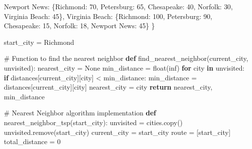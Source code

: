 \documentclass[
  letterpaper,
  DIV=11,
  numbers=noendperiod]{scrreprt}
\newenvironment{Shaded}{\begin{snugshade}}{\end{snugshade}}
\newcommand{\BuiltInTok}[1]{\textcolor[rgb]{0.00,0.23,0.31}{#1}}
\newcommand{\CommentTok}[1]{\textcolor[rgb]{0.37,0.37,0.37}{#1}}
\newcommand{\ControlFlowTok}[1]{\textcolor[rgb]{0.00,0.23,0.31}{\textbf{#1}}}
\newcommand{\DecValTok}[1]{\textcolor[rgb]{0.68,0.00,0.00}{#1}}
\newcommand{\KeywordTok}[1]{\textcolor[rgb]{0.00,0.23,0.31}{\textbf{#1}}}
\newcommand{\NormalTok}[1]{\textcolor[rgb]{0.00,0.23,0.31}{#1}}
\newcommand{\OperatorTok}[1]{\textcolor[rgb]{0.37,0.37,0.37}{#1}}
\newcommand{\StringTok}[1]{\textcolor[rgb]{0.13,0.47,0.30}{#1}}
\newcommand{\VariableTok}[1]{\textcolor[rgb]{0.07,0.07,0.07}{#1}}
\begin{document}
\begin{Shaded}
\begin{Highlighting}[]
    \StringTok{\textquotesingle{}Newport News\textquotesingle{}}\NormalTok{: \{}\StringTok{\textquotesingle{}Richmond\textquotesingle{}}\NormalTok{: }\DecValTok{70}\NormalTok{, }\StringTok{\textquotesingle{}Petersburg\textquotesingle{}}\NormalTok{: }\DecValTok{65}\NormalTok{, }\StringTok{\textquotesingle{}Chesapeake\textquotesingle{}}\NormalTok{: }\DecValTok{40}\NormalTok{, }\StringTok{\textquotesingle{}Norfolk\textquotesingle{}}\NormalTok{: }\DecValTok{30}\NormalTok{, }\StringTok{\textquotesingle{}Virginia Beach\textquotesingle{}}\NormalTok{: }\DecValTok{45}\NormalTok{\},}
    \StringTok{\textquotesingle{}Virginia Beach\textquotesingle{}}\NormalTok{: \{}\StringTok{\textquotesingle{}Richmond\textquotesingle{}}\NormalTok{: }\DecValTok{100}\NormalTok{, }\StringTok{\textquotesingle{}Petersburg\textquotesingle{}}\NormalTok{: }\DecValTok{90}\NormalTok{, }\StringTok{\textquotesingle{}Chesapeake\textquotesingle{}}\NormalTok{: }\DecValTok{15}\NormalTok{, }\StringTok{\textquotesingle{}Norfolk\textquotesingle{}}\NormalTok{: }\DecValTok{18}\NormalTok{, }\StringTok{\textquotesingle{}Newport News\textquotesingle{}}\NormalTok{: }\DecValTok{45}\NormalTok{\}}
\NormalTok{\}}

\NormalTok{start\_city }\OperatorTok{=} \StringTok{\textquotesingle{}Richmond\textquotesingle{}}

\CommentTok{\# Function to find the nearest neighbor}
\KeywordTok{def}\NormalTok{ find\_nearest\_neighbor(current\_city, unvisited):}
\NormalTok{    nearest\_city }\OperatorTok{=} \VariableTok{None}
\NormalTok{    min\_distance }\OperatorTok{=} \BuiltInTok{float}\NormalTok{(}\StringTok{\textquotesingle{}inf\textquotesingle{}}\NormalTok{)}
    \ControlFlowTok{for}\NormalTok{ city }\KeywordTok{in}\NormalTok{ unvisited:}
        \ControlFlowTok{if}\NormalTok{ distances[current\_city][city] }\OperatorTok{\textless{}}\NormalTok{ min\_distance:}
\NormalTok{            min\_distance }\OperatorTok{=}\NormalTok{ distances[current\_city][city]}
\NormalTok{            nearest\_city }\OperatorTok{=}\NormalTok{ city}
    \ControlFlowTok{return}\NormalTok{ nearest\_city, min\_distance}

\CommentTok{\# Nearest Neighbor algorithm implementation}
\KeywordTok{def}\NormalTok{ nearest\_neighbor\_tsp(start\_city):}
\NormalTok{    unvisited }\OperatorTok{=}\NormalTok{ cities.copy()}
\NormalTok{    unvisited.remove(start\_city)}
\NormalTok{    current\_city }\OperatorTok{=}\NormalTok{ start\_city}
\NormalTok{    route }\OperatorTok{=}\NormalTok{ [start\_city]}
\NormalTok{    total\_distance }\OperatorTok{=} \DecValTok{0}
    

\end{Highlighting}
\end{Shaded}
\end{document}
